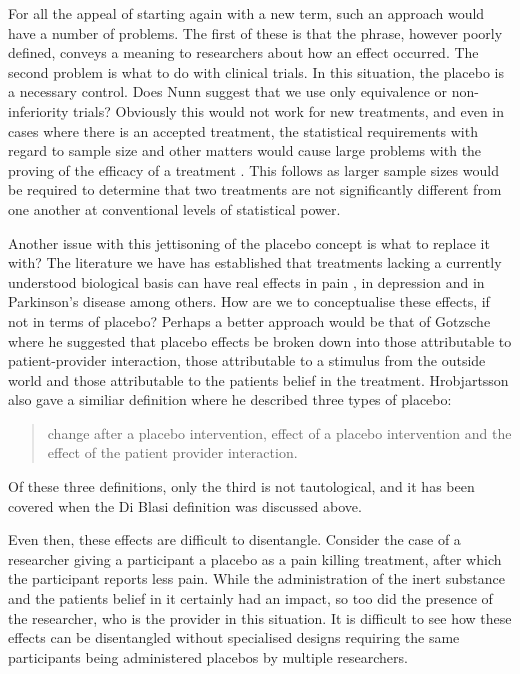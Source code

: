 For all the appeal of starting again with a new term, such an approach would have a number of problems. The first of these is  that the phrase, however poorly defined, conveys a meaning to researchers about how an effect occurred. 
The second problem is what to do with clinical trials. In this situation, the placebo is a necessary control. Does Nunn suggest that we use only equivalence or non-inferiority trials? Obviously this would not work for new treatments, and even in cases where there is an accepted treatment, the statistical requirements with regard to sample size and other matters would cause large problems with the proving of the efficacy of a treatment \cite{Benedetti2008}. This follows as larger sample sizes would be required to determine that two treatments are not significantly different from one another at conventional levels of statistical power. %

Another issue with this jettisoning of the placebo concept is what to replace it with? The literature we have has established that  treatments lacking a currently understood biological basis can have real effects \cite{Meissner2007}  in pain \cite{Vase2002} , in depression \cite{Kirsch2002a}  and in Parkinson's disease \cite{Benedetti2004a} among others. How are we to conceptualise these effects, if not in terms of placebo? Perhaps a better approach would be that of Gotzsche \cite{Gotzsche1995} where he suggested that placebo effects be broken down into those attributable to patient-provider interaction, those attributable to a stimulus from the outside world and those attributable to the patients belief in the treatment. Hrobjartsson also gave a similiar definition where he described three types of placebo:

\begin{quotation}
change after a placebo intervention, effect of a placebo intervention and the effect of the patient provider interaction. 
\end{quotation}

Of these three definitions, only the third is not tautological, and it has been covered when the Di Blasi definition was discussed above. 

Even then, these effects are difficult to disentangle. Consider the case of a researcher giving a participant a placebo as a pain killing treatment, after which the participant reports less pain. While the administration of the inert substance and the patients belief in it certainly had an impact, so too did the presence of the researcher, who is the provider in this situation. It is difficult to see how these effects can be disentangled without specialised designs requiring the same participants being administered placebos by multiple researchers.   




